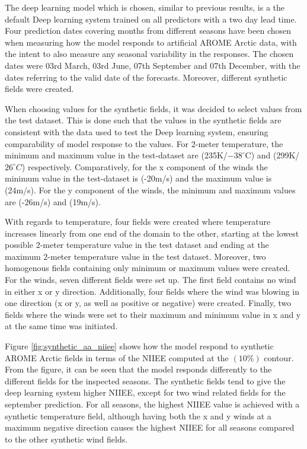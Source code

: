 \documentclass[../main/thesis.tex]{subfiles}
\begin{document}
The deep learning model which is chosen, similar to previous results, is a the default Deep learning system trained on all predictors with a two day lead time. Four prediction dates covering months from different seasons have been chosen when measuring how the model responds to artificial AROME Arctic data, with the intent to also measure any seasonal variability in the responses. The chosen dates were 03rd March, 03rd June, 07th September and 07th December, with the dates referring to the valid date of the forecasts. Moreover, different synthetic fields were created.

When choosing values for the synthetic fields, it was decided to select values from the test dataset. This is done such that the values in the synthetic fields are consistent with the data used to test the Deep learning system, ensuring comparability of model response to the values. For 2-meter temperature, the minimum and maximum value in the test-dataset are (235K/$-38^{\circ}$C) and (299K/$26^{\circ}C$) respectively. Comparatively, for the x component of the winds the minimum value in the test-dataset is (-20m/s) and the maximum value is (24m/s). For the y component of the winds, the minimum and maximum values are (-26m/s) and (19m/s).

With regards to temperature, four fields were created where temperature increases linearly from one end of the domain to the other, starting at the lowest possible 2-meter temperature value in the test dataset and ending at the maximum 2-meter temperature value in the test dataset. Moreover, two homogenous fields containing only minimum or maximum values were created. For the winds, seven different fields were set up. The first field contains no wind in either x or y direction. Additionally, four fields where the wind was blowing in one direction (x or y, as well as positive or negative) were created. Finally, two fields where the winds were set to their maximum and minimum value in x and y at the same time was initiated.

Figure \ref{fig:synthetic_aa_niiee} shows how the model respond to synthetic AROME Arctic fields in terms of the NIIEE computed at the $(10\%)$ contour. From the figure, it can be seen that the model responds differently to the different fields for the inspected seasons. The synthetic fields tend to give the deep learning system higher NIIEE, except for two wind related fields for the september prediction. For all seasons, the highest NIIEE value is achieved with a synthetic temperature field, although having both the x and y winds at a maximum negative direction causes the highest NIIEE for all seasons compared to the other synthetic wind fields.
\end{document}

